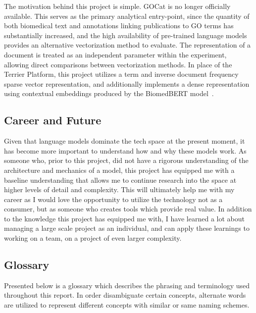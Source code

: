 \documentclass[11pt]{article}
\theoremstyle{plain}
\theoremstyle{definition}
\begin{document}
The motivation behind this project is simple. GOCat is no longer officially available. This serves as the primary analytical entry-point, since the quantity of both biomedical text and annotations linking publications to GO terms has substantially increased, and the high availability of pre-trained language models provides an alternative vectorization method to evaluate. The representation of a document is treated as an independent parameter within the experiment, allowing direct comparisons between vectorization methods. In place of the Terrier Platform, this project utilizes a term and inverse document frequency sparse vector representation, and additionally implements a dense representation using contextual embeddings produced by the BiomedBERT model~\cite{gu/2021/domainspecific}.

\subsection{Career and Future}\label{sec:introduction-career}

Given that language models dominate the tech space at the present moment, it has become more important to understand how and why these models work. As someone who, prior to this project, did not have a rigorous understanding of the architecture and mechanics of a model, this project has equipped me with a baseline understanding that allows me to continue research into the space at higher levels of detail and complexity. This will ultimately help me with my career as I would love the opportunity to utilize the technology not as a consumer, but as someone who creates tools which provide real value. In addition to the knowledge this project has equipped me with, I have learned a lot about managing a large scale project as an individual, and can apply these learnings to working on a team, on a project of even larger complexity.

\subsection{Glossary}\label{sec:introduction-glossary}

Presented below is a glossary which describes the phrasing and terminology used throughout this report. In order disambiguate certain concepts, alternate words are utilized to represent different concepts with similar or same naming schemes.
\end{document}
